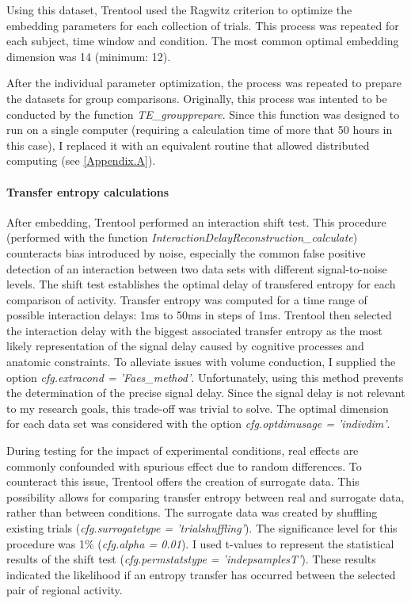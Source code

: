 Using this dataset, Trentool used the Ragwitz criterion to optimize the embedding parameters for each collection of trials.
This process was repeated for each subject, time window and condition.
The most common optimal embedding dimension was 14 (minimum: 12).

After the individual parameter optimization, the process was repeated to prepare the datasets for group comparisons.
Originally, this process was intented to be conducted by the function \emph{TE\_groupprepare}.
Since this function was designed to run on a single computer (requiring a calculation time of more that 50 hours in this case), I replaced it with an equivalent routine that allowed distributed computing (see \ref{Appendix.A}).

\paragraph{Transfer entropy calculations}

After embedding, Trentool performed an interaction shift test.
This procedure (performed with the function \emph{InteractionDelayReconstruction\_calculate}) counteracts bias introduced by noise, especially the common false positive detection of an interaction between two data sets with different signal-to-noise levels.
The shift test establishes the optimal delay of transfered entropy for each comparison of activity.
Transfer entropy was computed for a time range of possible interaction delays: 1ms to 50ms in steps of 1ms.
Trentool then selected the interaction delay with the biggest associated transfer entropy as the most likely representation of the signal delay caused by cognitive processes and anatomic constraints.
To alleviate issues with volume conduction, I supplied the option \emph{cfg.extracond = 'Faes\_method'}.
Unfortunately, using this method prevents the determination of the precise signal delay.
Since the signal delay is not relevant to my research goals, this trade-off was trivial to solve.
The optimal dimension for each data set was considered with the option \emph{cfg.optdimusage = 'indivdim'}.

During testing for the impact of experimental conditions, real effects are commonly confounded with spurious effect due to random differences.
To counteract this issue, Trentool offers the creation of surrogate data.
This possibility allows for comparing transfer entropy between real and surrogate data, rather than between conditions.
The surrogate data was created by shuffling existing trials (\emph{cfg.surrogatetype = 'trialshuffling'}).
The significance level for this procedure was 1\% (\emph{cfg.alpha = 0.01}).
I used t-values to represent the statistical results of the shift test (\emph{cfg.permstatstype = 'indepsamplesT'}).
These results indicated the likelihood if an entropy transfer has occurred between the selected pair of regional activity.

